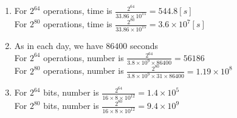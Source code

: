 \documentclass{assignment}
\begin{document}
    \maketitle

    \newpage
    \begin{homeworkProblem}
\begin{enumerate}
\item For $2^{64}$ operations, time is $\displaystyle \frac{2^{64}}{33.86\times 10^{15}} = 544.8[s]$ \\[1.5ex]
For $2^{80}$ operations, time is $\displaystyle\frac{2^{80}}{33.86\times 10^{15}} = 3.6\times 10^7[s]$
\item  As in each day, we have $86400$ seconds\\[1.5ex]
For $2^{64}$ operations, number is $\displaystyle \frac{2^{64}}{3.8\times 10^{9} \times 86400} = 56186$ \\[1.5ex]
For $2^{80}$ operations, number is $\displaystyle \frac{2^{80}}{3.8\times 10^{9} \times 31\times 86400} = 1.19 \times 10^8$ 
\item  
For $2^{64}$ bits, number is $\displaystyle \frac{2^{64}}{16\times 8\times 10^{12} } = 1.4\times 10^5$ \\[1.5ex]
For $2^{80}$ bits, number is $\displaystyle \frac{2^{80}}{16\times 8\times 10^{12} } = 9.4\times 10^9$
\end{enumerate}    
    
    \end{homeworkProblem}   
    
\end{document}
